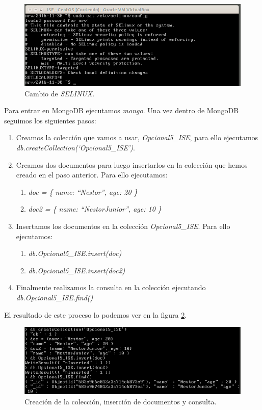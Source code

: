 \documentclass[a4paper,titlepage,12pt]{scrartcl}	%
\numberwithin{figure}{section} %
\numberwithin{table}{section} %
\begin{document}
	\begin{figure}[H]
		\includegraphics[width=\linewidth]{./Imagenes/O5-2.png}
		\vspace{-0.5cm}
		\caption[Cambio de \textit{SELINUX}.]{Cambio de \textit{SELINUX}.}
		\label{O5-2}
	\end{figure}
	
	Para entrar en MongoDB ejecutamos \textit{mongo}. Una vez dentro de MongoDB seguimos los siguientes pasos:
	\begin{enumerate}
		\item Creamos la colección que vamos a usar, \textit{Opcional5\_ISE}, para ello ejecutamos \\ \textit{db.createCollection(`Opcional5\_ISE')}.
		\item Creamos dos documentos para luego insertarlos en la colección que hemos creado en el paso anterior. Para ello ejecutamos:
		\begin{enumerate}
			\item \textit{doc = \{ name: ``Nestor'', age: 20 \}}
			\item \textit{doc2 = \{ name: ``NestorJunior'', age: 10 \}}
		\end{enumerate}
		\item Insertamos los documentos en la colección \textit{Opcional5\_ISE}. Para ello ejecutamos:
		\begin{enumerate}
			\item \textit{db.Opcional5\_ISE.insert(doc)}
			\item \textit{db.Opcional5\_ISE.insert(doc2)}
		\end{enumerate}
		\item Finalmente realizamos la consulta en la colección ejecutando \textit{db.Opcional5\_ISE.find()}
	\end{enumerate}
	
	El resultado de este proceso lo podemos ver en la figura \ref{O5-3}.
	
	\begin{figure}[H]
		\includegraphics[width=\linewidth]{./Imagenes/O5-3.png}
		\vspace{-0.5cm}
		\caption[Creación de la colección, inserción de documentos y consulta.]{Creación de la colección, inserción de documentos y consulta.}
		\label{O5-3}
	\end{figure}
	
	\clearpage
	
	
\end{document}
